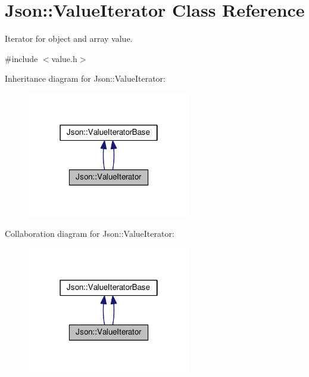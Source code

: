 \hypertarget{classJson_1_1ValueIterator}{\section{Json\-:\-:Value\-Iterator Class Reference}
\label{de/dd0/classJson_1_1ValueIterator}
}


Iterator for object and array value.  




{\ttfamily \#include $<$value.\-h$>$}



Inheritance diagram for Json\-:\-:Value\-Iterator\-:
\nopagebreak
\begin{figure}[H]
\begin{center}
\leavevmode
\includegraphics[width=202pt]{d3/d75/classJson_1_1ValueIterator__inherit__graph}
\end{center}
\end{figure}


Collaboration diagram for Json\-:\-:Value\-Iterator\-:
\nopagebreak
\begin{figure}[H]
\begin{center}
\leavevmode
\includegraphics[width=202pt]{d3/dd0/classJson_1_1ValueIterator__coll__graph}
\end{center}
\end{figure}
